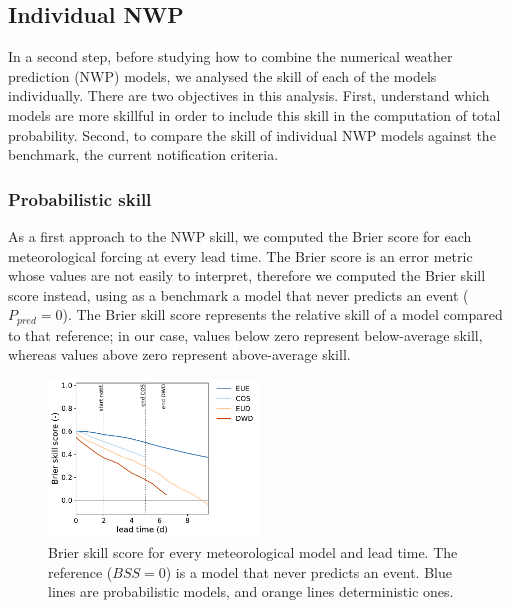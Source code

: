 \documentclass[preprint,12pt]{elsarticle}
\begin{document}
\subsection{Individual NWP}
\label{sec:results_NWP}

In a second step, before studying how to combine the numerical weather prediction (NWP) models, we analysed the skill of each of the models individually. There are two objectives in this analysis. First, understand which models are more skillful in order to include this skill in the computation of total probability. Second, to compare the skill  of individual NWP models against the benchmark, the current notification criteria.

\subsubsection{Probabilistic skill}
\label{sec:NWP_prob_skill}

As a first approach to the NWP skill, we computed the Brier score for each meteorological forcing at every lead time. The Brier score is an error metric whose values are not easily to interpret, therefore we computed the Brier skill score instead, using as a benchmark a model that never predicts an event ($P_{pred}=0$). The Brier skill score represents the relative skill of a model compared to that reference; in our case, values below zero represent below-average skill, whereas values above zero represent above-average skill. 

\begin{figure}
    \centering
    \includegraphics[width=0.5\textwidth]{figures/Brier_skill_score_5.pdf}
    \caption{Brier skill score for every meteorological model and lead time. The reference ($BSS=0$) is a model that never predicts an event. Blue lines are probabilistic models, and orange lines deterministic ones.}
    \label{fig:brier_score}
\end{figure}
\end{document}
